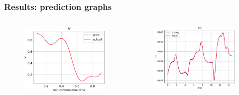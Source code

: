 \begin{frame}
	\frametitle{Results: prediction graphs}
	\begin{columns}
		\begin{column}{0.5\linewidth}
			\begin{figure}
				\includegraphics[scale=0.35]{supportingFiles/V.png}
			\end{figure}
		\end{column}
		\begin{column}{0.5\linewidth}
			\begin{figure}
				\includegraphics[scale=0.35]{supportingFiles/CD_output.png}
			\end{figure}

\end{column}
\end{columns}
\end{frame}
